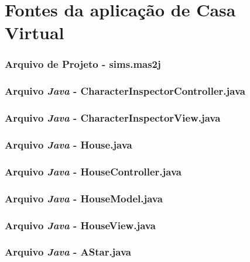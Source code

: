 \chapter{Fontes da aplicação de Casa Virtual}

\subsection*{Arquivo de Projeto - sims.mas2j}


\subsection*{Arquivo \emph{Java} - CharacterInspectorController.java}


\subsection*{Arquivo \emph{Java} - CharacterInspectorView.java}


\subsection*{Arquivo \emph{Java} - House.java}


\subsection*{Arquivo \emph{Java} - HouseController.java}


\subsection*{Arquivo \emph{Java} - HouseModel.java}


\subsection*{Arquivo \emph{Java} - HouseView.java}


\subsection*{Arquivo \emph{Java} - AStar.java}


